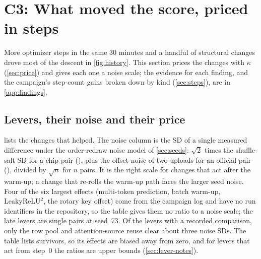 \section{C3: What moved the score, priced in steps}
\label{sec:findings}

More optimizer steps in the same 30 minutes and a handful of structural changes drove most of the descent in
\cref{fig:history}. This section prices the changes with $\kappa$ (\cref{sec:price}) and gives each one a noise scale;
the evidence for each finding, and the campaign's step-count gains broken down by kind (\cref{sec:steps}), are in
\cref{app:findings}.

\subsection{Levers, their noise and their price}
\label{sec:levers}

 lists the changes that helped. The noise column is the SD of a single measured difference under the
order-redraw noise model of \cref{sec:seeds}: $\sqrt2$ times the shuffle-salt SD for a chip pair
(), plus the offset noise of two uploads for an official pair (),
divided by $\sqrt n$ for $n$ pairs. It is the right scale for changes that act after the warm-up; a change that
re-rolls the warm-up path faces the larger seed noise. Four of the six largest effects (multi-token prediction,
batch warm-up, LeakyReLU$^2$, the rotary key offset) come from the campaign log and have no run identifiers in the
repository, so the table gives them no ratio to a noise scale; the late levers are single pairs at seed~73. Of the
levers with a recorded comparison, only the row pool and attention-source reuse clear about three noise SDs. The
table lists survivors, so its effects are biased away from zero, and for levers that act from step~0 the ratios are
upper bounds (\cref{sec:lever-notes}).

\begin{table}[tbp]
  \centering
  \caption{\textbf{Levers that worked.} $\Delta$: change in \valbpb{} against the lever's control, in $10^{-3}$
    (negative is better). Noise SD: SD of the measured difference ($10^{-3}$, see \cref{sec:levers}); no ratio
    $|\Delta|/\text{SD}$ is given for campaign-log rows, which have no recorded comparison. Evidence: ``chip pair'',
    same-seed same-chip rehearsals, raw; ``step-norm.'', normalised for a step-count difference; ``official pair'',
    two uploads that differ by this change. Steps: the step equivalent $\exp(|\Delta|/\kappa)-1$ at
    $\kappa=\val{kappa}$. \textsuperscript{$\dagger$}\,Listed in \texttt{docs/FINDINGS.md} without run identifiers,
    mostly on earlier recipe bases. \textsuperscript{$\ddagger$}\,The batch warm-up changes the step count itself, so
    a step equivalent would double-count.}
  \label{tab:levers}
  
\end{table}

